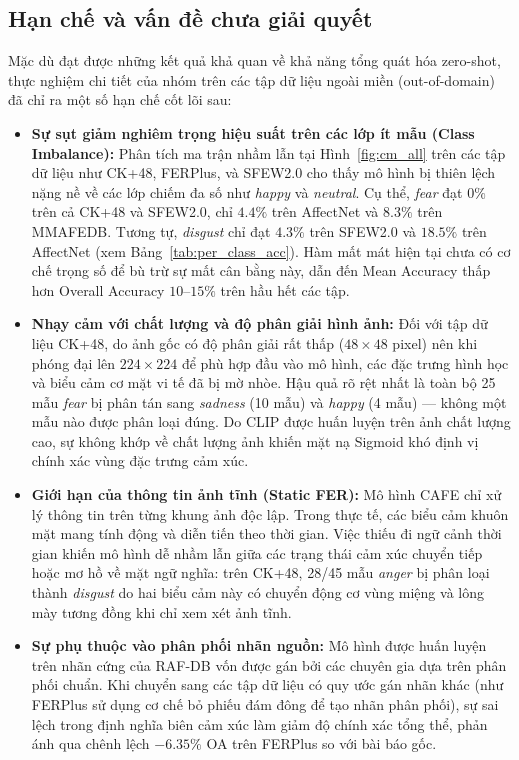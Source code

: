 \subsection{Hạn chế và vấn đề chưa giải quyết}

Mặc dù đạt được những kết quả khả quan về khả năng tổng quát hóa zero-shot, thực nghiệm chi tiết của nhóm trên các tập dữ liệu ngoài miền (out-of-domain) đã chỉ ra một số hạn chế cốt lõi sau:

\begin{itemize}
    \item \textbf{Sự sụt giảm nghiêm trọng hiệu suất trên các lớp ít mẫu (Class Imbalance):} Phân tích ma trận nhầm lẫn tại Hình~\ref{fig:cm_all} trên các tập dữ liệu như CK+48, FERPlus, và SFEW2.0 cho thấy mô hình bị thiên lệch nặng nề về các lớp chiếm đa số như \textit{happy} và \textit{neutral}. Cụ thể, \textit{fear} đạt $0\%$ trên cả CK+48 và SFEW2.0, chỉ $4.4\%$ trên AffectNet và $8.3\%$ trên MMAFEDB. Tương tự, \textit{disgust} chỉ đạt $4.3\%$ trên SFEW2.0 và $18.5\%$ trên AffectNet (xem Bảng~\ref{tab:per_class_acc}). Hàm mất mát hiện tại chưa có cơ chế trọng số để bù trừ sự mất cân bằng này, dẫn đến Mean Accuracy thấp hơn Overall Accuracy $10$--$15\%$ trên hầu hết các tập.
    \item \textbf{Nhạy cảm với chất lượng và độ phân giải hình ảnh:} Đối với tập dữ liệu CK+48, do ảnh gốc có độ phân giải rất thấp ($48 \times 48$ pixel) nên khi phóng đại lên $224 \times 224$ để phù hợp đầu vào mô hình, các đặc trưng hình học và biểu cảm cơ mặt vi tế đã bị mờ nhòe. Hậu quả rõ rệt nhất là toàn bộ 25 mẫu \textit{fear} bị phân tán sang \textit{sadness} (10 mẫu) và \textit{happy} (4 mẫu) --- không một mẫu nào được phân loại đúng. Do CLIP được huấn luyện trên ảnh chất lượng cao, sự không khớp về chất lượng ảnh khiến mặt nạ Sigmoid khó định vị chính xác vùng đặc trưng cảm xúc.
    \item \textbf{Giới hạn của thông tin ảnh tĩnh (Static FER):} Mô hình CAFE chỉ xử lý thông tin trên từng khung ảnh độc lập. Trong thực tế, các biểu cảm khuôn mặt mang tính động và diễn tiến theo thời gian. Việc thiếu đi ngữ cảnh thời gian khiến mô hình dễ nhầm lẫn giữa các trạng thái cảm xúc chuyển tiếp hoặc mơ hồ về mặt ngữ nghĩa: trên CK+48, 28/45 mẫu \textit{anger} bị phân loại thành \textit{disgust} do hai biểu cảm này có chuyển động cơ vùng miệng và lông mày tương đồng khi chỉ xem xét ảnh tĩnh.
    \item \textbf{Sự phụ thuộc vào phân phối nhãn nguồn:} Mô hình được huấn luyện trên nhãn cứng của RAF-DB vốn được gán bởi các chuyên gia dựa trên phân phối chuẩn. Khi chuyển sang các tập dữ liệu có quy ước gán nhãn khác (như FERPlus sử dụng cơ chế bỏ phiếu đám đông để tạo nhãn phân phối), sự sai lệch trong định nghĩa biên cảm xúc làm giảm độ chính xác tổng thể, phản ánh qua chênh lệch $-6.35\%$ OA trên FERPlus so với bài báo gốc.
\end{itemize}


